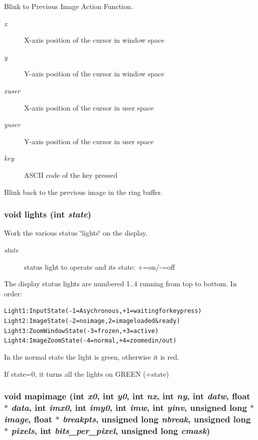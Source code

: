 Blink to Previous Image Action Function. 

\begin{Desc}
\item[Parameters:]
\begin{description}
\item[{\em x}]X-axis position of the cursor in window space \item[{\em y}]Y-axis position of the cursor in window space \item[{\em xuser}]X-axis position of the cursor in user space \item[{\em yuser}]Y-axis position of the cursor in user space \item[{\em key}]ASCII code of the key pressed\end{description}
\end{Desc}
Blink back to the previous image in the ring buffer. 
\subsubsection{\setlength{\rightskip}{0pt plus 5cm}void lights (int {\em state})}\label{xtvutils_8c_a186}


Work the various status \char`\"{}lights\char`\"{} on the display. 

\begin{Desc}
\item[Parameters:]
\begin{description}
\item[{\em state}]status light to operate and its state: +=on/-=off\end{description}
\end{Desc}
The display status lights are numbered 1..4 running from top to bottom. In order: \small\begin{alltt}
  Light 1: Input State (-1=Asychronous, +1=waiting for key press)
  Light 2: Image State (-2=no image, 2=image loaded \& ready)
  Light 3: Zoom Window State (-3=frozen, +3=active)
  Light 4: Image Zoom State (-4 = normal, +4=zoomed in/out)
  \end{alltt}\normalsize 
 In the normal state the light is green, otherwise it is red.

If state=0, it turns all the lights on GREEN (+state) 
\subsubsection{\setlength{\rightskip}{0pt plus 5cm}void mapimage (int {\em x0}, int {\em y0}, int {\em nx}, int {\em ny}, int {\em datw}, float $\ast$ {\em data}, int {\em imx0}, int {\em imy0}, int {\em imw}, int {\em yinv}, unsigned long $\ast$ {\em image}, float $\ast$ {\em breakpts}, unsigned long {\em nbreak}, unsigned long $\ast$ {\em pixels}, int {\em bits\_\-per\_\-pixel}, unsigned long {\em cmask})}\label{xtvutils_8c_a224}


